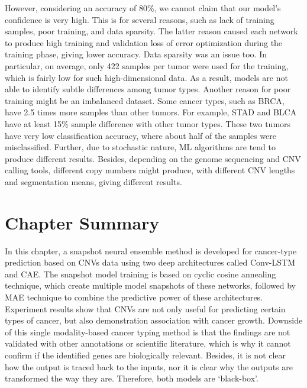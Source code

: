 \hspace*{3.5mm} However, considering an accuracy of 80\%, we cannot claim that our model’s confidence is very high. This is for several reasons, such as lack of training samples, poor training, and data sparsity. The latter reason caused each network to produce high training and validation loss of error optimization during the training phase, giving lower accuracy. Data sparsity was an issue too. In particular, on average, only 422 samples per tumor were used for the training, which is fairly low for such high-dimensional data. As a result, models are not able to identify subtle differences among tumor types. 
Another reason for poor training might be an imbalanced dataset. Some cancer types, such as BRCA, have 2.5 times more samples than other tumors. For example, STAD and BLCA have at least 15\% sample difference with other tumor types. These two tumors have very low classification accuracy, where about half of the samples were misclassified. Further, due to stochastic nature, ML algorithms are tend to produce different results. Besides, depending on the genome sequencing and CNV calling tools, different copy numbers might produce, with different CNV lengths and segmentation means, giving different results.

\section{Chapter Summary} \label{chapter_3:conclusion}
In this chapter, a snapshot neural ensemble method is developed for cancer-type prediction based on CNVs data using two deep architectures called Conv-LSTM and CAE. The snapshot model training is based on cyclic cosine annealing technique, which create multiple model snapshots of these networks, followed by MAE technique to combine the predictive power of these architectures. Experiment results show that CNVs are not only useful for predicting certain types of cancer, but also demonstration association with cancer growth. %
Downside of this single modality-based cancer typing method is that the findings are not validated with other annotations or scientific literature, which is why it cannot confirm if the identified genes are biologically relevant. Besides, it is not clear how the output is traced back to the inputs, nor it is clear why the outputs are transformed the way they are. Therefore, both models are `black-box'. 

